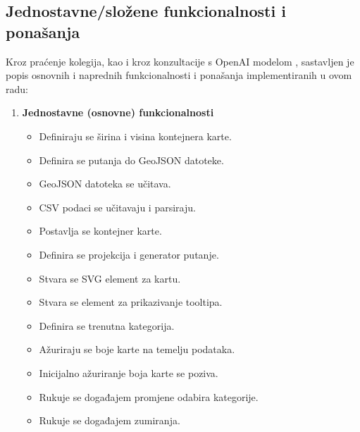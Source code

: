 \documentclass[12pt]{article}
\numberwithin{equation}{section}
\begin{document}
\subsection{Jednostavne/složene funkcionalnosti i ponašanja}
Kroz praćenje kolegija, kao i kroz konzultacije s OpenAI modelom \cite{gpt3.5}, sastavljen je popis osnovnih i naprednih funkcionalnosti i ponašanja implementiranih u ovom radu:
\begin{enumerate}[label=\arabic*.]
  \item \textbf{Jednostavne (osnovne) funkcionalnosti}
  \begin{itemize}
    \item Definiraju se širina i visina kontejnera karte.
    \item Definira se putanja do GeoJSON datoteke.
    \item GeoJSON datoteka se učitava.
    \item CSV podaci se učitavaju i parsiraju.
    \item Postavlja se kontejner karte.
    \item Definira se projekcija i generator putanje.
    \item Stvara se SVG element za kartu.
    \item Stvara se element za prikazivanje tooltipa.
    \item Definira se trenutna kategorija.
    \item Ažuriraju se boje karte na temelju podataka.
    \item Inicijalno ažuriranje boja karte se poziva.
    \item Rukuje se događajem promjene odabira kategorije.
    \item Rukuje se događajem zumiranja.
  \end{itemize}


\end{enumerate}
\end{document}

